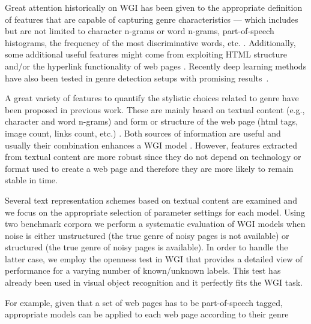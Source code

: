Great attention historically on WGI has been given to the appropriate definition of features that are capable of capturing genre characteristics --- which includes but are not limited to character n-grams or word n-grams, part-of-speech histograms, the frequency of the most discriminative words, etc.  \cite{kanaris2009learning,kumari2014web,levering2008using,Lim2005,mason2009n,onan2018ensemble,petrenz2011stable,sharoff2010web}. Additionally, some additional useful features might come from exploiting HTML structure and/or the hyperlink functionality of web pages \cite{abramson2012_URL,asheghi2014semi,jebari2014pure_URL,priyatam2013don_URL,zhu2011enhance}. Recently deep learning methods have also been tested in genre detection setups with promising results~\cite{worsham2018genre}. 

A great variety of features to quantify the stylistic choices related to genre have been proposed in previous work. These are mainly based on textual content (e.g., character and word  n-grams) \parencite{mason2009distance,Sharroff2010} and form or structure of the web page (html tags, image count, links count, etc.) \parencite{Lim2005,levering2008using}. Both sources of  information are useful and usually their combination enhances a WGI model \parencite{kanaris2009learning}. However, features extracted from textual content are more robust since they do not  depend on technology or format used to create a web page and therefore they are more likely to remain stable in time.

 Several text  representation schemes based on textual content are examined and we focus on the appropriate selection of parameter settings for each model. Using two benchmark corpora we perform a  systematic evaluation of WGI models when noise is either unstructured (the true genre of noisy pages is not available) or structured (the true genre of noisy pages is available). In order  to handle the latter case, we employ the openness test in WGI that provides a detailed view of performance for a varying number of known/unknown labels. This test has already been used in  visual object recognition \parencite{scheirer2013toward} and it perfectly fits the WGI task.

 For example, given that a set of web pages has to be part-of-speech tagged, appropriate models can be applied to each web page according to their genre \parencite{Nooralahzadeh2014}

